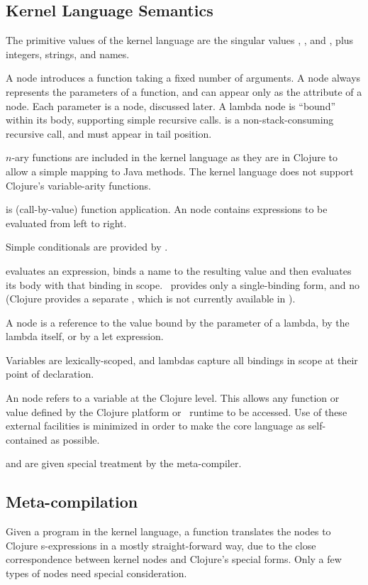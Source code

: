 \subsection{Kernel Language Semantics}
The primitive values of the kernel language are the singular values , , and , plus integers, strings, and names.

A  node introduces a function taking a fixed number of arguments. A  node always represents the parameters of a function, and can appear only as the  attribute of a  node. Each parameter is a  node, discussed later. A lambda node is ``bound'' within its body, supporting simple recursive calls.  is a non-stack-consuming recursive call, and must appear in tail position.

$n$-ary functions are included in the kernel language as they are in Clojure to allow a simple mapping to Java methods. The kernel language does not support Clojure's variable-arity functions.

 is (call-by-value) function application. An  node contains expressions to be evaluated from left to right.

Simple conditionals are provided by .

 evaluates an expression, binds a name to the resulting value and then evaluates its body with that binding in scope. \Meta\ provides only a single-binding  form, and no  (Clojure provides a separate , which is not currently available in \Meta). 

A  node is a reference to the value bound by the parameter of a lambda, by the lambda itself, or by a let expression. 

Variables are lexically-scoped, and lambdas capture all bindings in scope at their point of declaration.

An  node refers to a variable at the Clojure level. This allows any function or value defined by the Clojure platform or \Meta\ runtime to be accessed. Use of these external facilities is minimized in order to make the core language as self-contained as possible.  

 and  are given special treatment by the meta-compiler.

\subsection{Meta-compilation}
Given a program in the kernel language, a function  translates the nodes to Clojure s-expressions in a mostly straight-forward way, due to the close correspondence between kernel nodes and Clojure's special forms. Only a few types of nodes need special consideration. %

